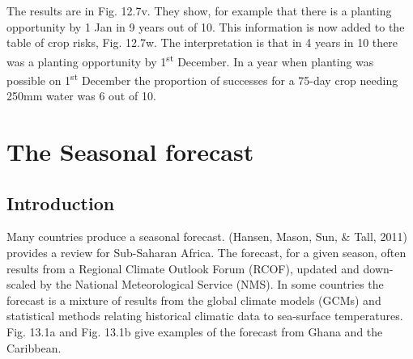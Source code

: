 \documentclass[
  letterpaper,
  DIV=11,
  numbers=noendperiod]{scrreprt}
\begin{document}
The results are in Fig. 12.7v. They show, for example that there is a
planting opportunity by 1 Jan in 9 years out of 10. This information is
now added to the table of crop risks, Fig. 12.7w. The interpretation is
that in 4 years in 10 there was a planting opportunity by
1\textsuperscript{st} December. In a year when planting was possible on
1\textsuperscript{st} December the proportion of successes for a 75-day
crop needing 250mm water was 6 out of 10.


\chapter{The Seasonal forecast}\label{the-seasonal-forecast}

\section{Introduction}\label{introduction-12}

Many countries produce a seasonal forecast. (Hansen, Mason, Sun, \&
Tall, 2011) provides a review for Sub-Saharan Africa. The forecast, for
a given season, often results from a Regional Climate Outlook Forum
(RCOF), updated and down-scaled by the National Meteorological Service
(NMS). In some countries the forecast is a mixture of results from the
global climate models (GCMs) and statistical methods relating historical
climatic data to sea-surface temperatures. Fig. 13.1a and Fig. 13.1b
give examples of the forecast from Ghana and the Caribbean.
\end{document}
